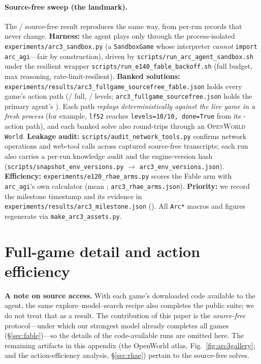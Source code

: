 \documentclass[11pt]{article}
\newcommand{\openworld}{\textsc{OpenWorld}}
\begin{document}
\paragraph{Source-free sweep (the landmark).} The \ArcFableFull/\ArcUnionGames{} source-free result
reproduces the same way, from per-run records that never change. \textbf{Harness:} the agent plays only
through the process-isolated \texttt{experiments/arc3\_sandbox.py} (a \texttt{SandboxGame} whose
interpreter \emph{cannot} \texttt{import arc\_agi}---fair by construction), driven by
\texttt{scripts/run\_arc\_agent\_sandbox.sh} under the resilient wrapper
\texttt{scripts/run\_e140\_fable\_backoff.sh} (full budget, max reasoning, rate-limit-resilient).
\textbf{Banked solutions:} \texttt{experiments/results/arc3\_fullgame\_sourcefree\_fable.json} holds every
game's action path (\ArcFableFull/\ArcUnionGames{} full, \ArcFableLevels/\ArcTotalLevels{} levels;
\texttt{arc3\_fullgame\_sourcefree.json} holds the primary agent's \ArcSFGames{}). Each path
\emph{replays deterministically against the live game in a fresh process} (for example, \texttt{lf52}
reaches \texttt{levels=10/10, done=True} from its \ArcFableLfTwoActs{}-action path), and each banked solve
also round-trips through an \openworld{} \texttt{World}. \textbf{Leakage audit:}
\texttt{scripts/audit\_network\_tools.py} confirms \ArcAuditNetHits{} network operations and
\ArcAuditWebCalls{} web-tool calls across \ArcAuditTranscripts{} captured source-free transcripts; each run
also carries a per-run knowledge audit and the engine-version hash
(\texttt{scripts/snapshot\_env\_versions.py} $\to$ \texttt{arc3\_env\_versions.json}).
\textbf{Efficiency:} \texttt{experiments/e120\_rhae\_arms.py} scores the Fable arm with \texttt{arc\_agi}'s
own calculator (mean \ArcFableRhae{}; \texttt{arc3\_rhae\_arms.json}). \textbf{Priority:} we record the
milestone timestamp and its evidence in \texttt{experiments/results/arc3\_milestone.json}
(\ArcMilestoneUTC{}). All \texttt{Arc*} macros and figures regenerate via \texttt{make\_arc3\_assets.py}.

\clearpage
\appendix

\section{Full-game detail and action efficiency}
\label{app:fullgame-detail}
\textbf{A note on source access.} With each game's downloaded code available to the agent, the same
explore--model--search recipe also completes the public suite; we do not treat that as a result. The
contribution of this paper is the \emph{source-free} protocol---under which our strongest model already
completes all \ArcUnionGames{} games (\S\ref{sec:fable})---so the details of the code-available runs are
omitted here. The remaining artifacts in this appendix (the OpenWorld atlas, Fig.~\ref{fig:arc3gallery};
and the action-efficiency analysis, \S\ref{sec:rhae}) pertain to the source-free solves.
\end{document}

